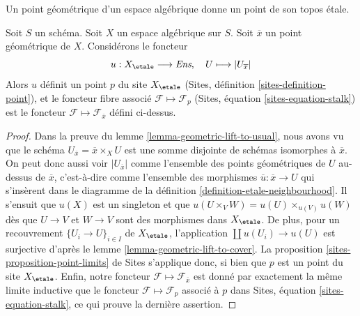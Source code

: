 \begin{lemma}
\label{lemma-stalk-gives-point}
\begin{slogan}
Un point géométrique d'un espace algébrique donne un point de son topos \'etale.
\end{slogan}
Soit $S$ un schéma.
Soit $X$ un espace algébrique sur $S$.
Soit $\overline{x}$ un point géométrique de $X$.
Considérons le foncteur
$$
u : X_\etale \longrightarrow \textit{Ens}, \quad
U \longmapsto |U_{\overline{x}}|
$$
Alors $u$ définit un point $p$ du site $X_\etale$
(Sites, définition \ref{sites-definition-point}),
et le foncteur fibre associé $\mathcal{F} \mapsto \mathcal{F}_p$
(Sites, équation \ref{sites-equation-stalk})
est le foncteur $\mathcal{F} \mapsto \mathcal{F}_{\overline{x}}$
défini ci-dessus.
\end{lemma}

\begin{proof}
Dans la preuve du
lemme \ref{lemma-geometric-lift-to-usual},
nous avons vu que le schéma $U_{\overline{x}} = \overline{x} \times_X U$
est une somme disjointe de
schémas isomorphes à $\overline{x}$. On peut donc aussi voir
$|U_{\overline{x}}|$ comme l'ensemble des points géométriques de $U$
au-dessus de $\overline{x}$, c'est-à-dire comme l'ensemble des morphismes
$\overline{u} : \overline{x} \to U$ qui s'insèrent dans le diagramme de la
définition \ref{definition-etale-neighbourhood}.
Il s'ensuit que $u(X)$ est un singleton et que
$u(U \times_V W) = u(U) \times_{u(V)} u(W)$
dès que $U \to V$ et $W \to V$ sont des morphismes dans $X_\etale$.
De plus, pour un recouvrement $\{U_i \to U\}_{i \in I}$ de $X_\etale$,
l'application $\coprod u(U_i) \to u(U)$ est surjective d'après le
lemme \ref{lemma-geometric-lift-to-cover}.
La
proposition \ref{sites-proposition-point-limits} de Sites
s'applique donc, si bien que $p$ est un point du site $X_\etale$.
Enfin, notre foncteur $\mathcal{F} \mapsto \mathcal{F}_{\overline{x}}$
est donné par exactement la même limite inductive que le foncteur
$\mathcal{F} \mapsto \mathcal{F}_p$ associé à $p$ dans
Sites, équation \ref{sites-equation-stalk},
ce qui prouve la dernière assertion.
\end{proof}

